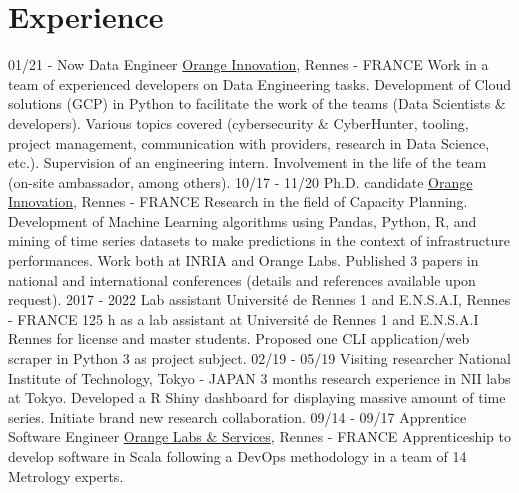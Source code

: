\documentclass[]{friggeri-cv}
\begin{document}
\section{Experience}
\begin{entrylist}
  \entry
    {01/21 - Now}
    {Data Engineer}
    {\href{http://www.orange.com/en/home}{Orange Innovation}, Rennes - FRANCE}
    {Work in a team of experienced developers on Data Engineering tasks. 
    Development of Cloud solutions (GCP) in Python to facilitate the work of the teams (Data Scientists \& developers).
    Various topics covered (cybersecurity \& CyberHunter, tooling, project management, communication with providers, research in Data Science, etc.). 
    Supervision of an engineering intern. Involvement in the life of the team (on-site ambassador, among others).  
    }
  \entry
    {10/17 - 11/20}
    {Ph.D. candidate}
    {\href{http://www.orange.com/en/home}{Orange Innovation}, Rennes - FRANCE}
    {Research in the field of Capacity Planning. 
    Development of Machine Learning algorithms using Pandas, Python, R, and mining of time series datasets to make predictions in the context of infrastructure performances. 
    Work both at INRIA and Orange Labs. 
    Published 3 papers in national and international conferences (details and references available upon request).
    }
    \vspace{-1.1em}
  \entry
    {2017 - 2022}
    {Lab assistant}
    {Université de Rennes 1 and E.N.S.A.I, Rennes - FRANCE}
    {125 h as a lab assistant at Université de Rennes 1 and E.N.S.A.I Rennes for license and master students. 
    Proposed one CLI application/web scraper in Python 3 as project subject.
    }
    \entry
    {02/19 - 05/19}
    {Visiting researcher}
    {National Institute of Technology, Tokyo - JAPAN}
    {3 months research experience in NII labs at Tokyo. 
    Developed a R Shiny dashboard for displaying massive amount of time series.
    Initiate brand new research collaboration. 
    }
  \entry
    {09/14 - 09/17}
    {Apprentice Software Engineer}
    {\href{http://www.orange.com/en/home}{Orange Labs \& Services}, Rennes - FRANCE}
    {Apprenticeship to develop software in Scala following a DevOps methodology in a team of 14 Metrology experts. %
}
\end{entrylist}
\end{document}
